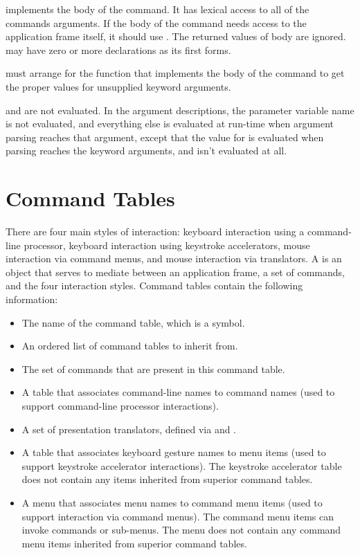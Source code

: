  implements the body of the command.  It has lexical access to all of
the commands arguments.  If the body of the command needs access to the
application frame itself, it should use .  The returned
values of body are ignored.   may have zero or more declarations as
its first forms. 

 must arrange for the function that implements the body of
the command to get the proper values for unsupplied keyword arguments.

 and  are not evaluated.  In the argument
descriptions, the parameter variable name is not evaluated, and everything else
is evaluated at run-time when argument parsing reaches that argument, except
that the value for  is evaluated when parsing reaches the keyword
arguments, and  isn't evaluated at all.


\section {Command Tables}

There are four main styles of interaction: keyboard interaction using a command-
line processor, keyboard interaction using keystroke accelerators, mouse
interaction via command menus, and mouse interaction via translators.  A
 is an object that serves to mediate between an
application frame, a set of commands, and the four interaction styles.  Command
tables contain the following information:

\begin{itemize}
\item The name of the command table, which is a symbol.

\item An ordered list of command tables to inherit from.

\item The set of commands that are present in this command table.

\item A table that associates command-line names to command names (used to
support command-line processor interactions).

\item A set of presentation translators, defined via
 and
.

\item A table that associates keyboard gesture names to menu items (used to
support keystroke accelerator interactions).  The keystroke accelerator table
does not contain any items inherited from superior command tables.

\item A menu that associates menu names to command menu items (used to support
interaction via command menus).  The command menu items can invoke commands or
sub-menus.  The menu does not contain any command menu items inherited from
superior command tables.
\end{itemize}

